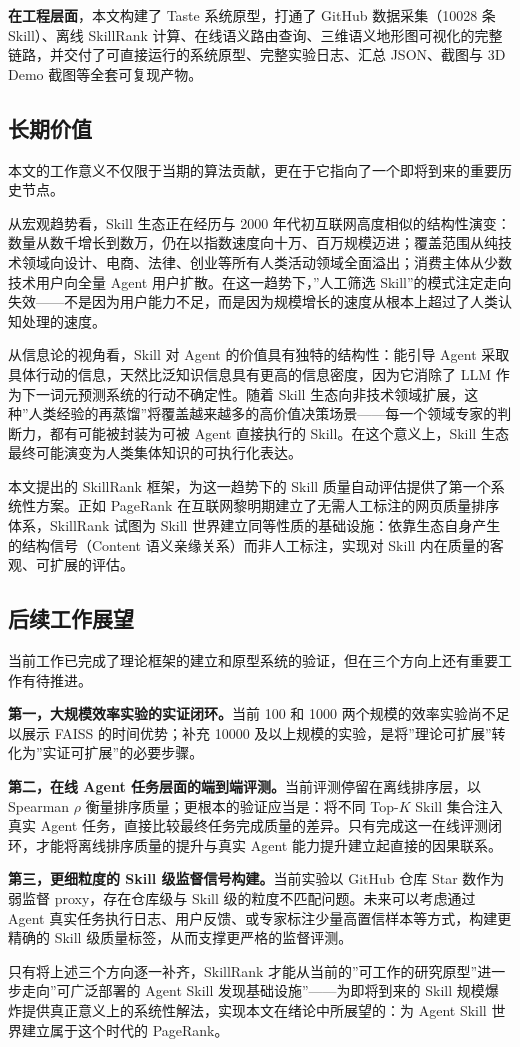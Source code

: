 \textbf{在工程层面}，本文构建了 Taste 系统原型，打通了 GitHub 数据采集（10028 条 Skill）、离线 SkillRank 计算、在线语义路由查询、三维语义地形图可视化的完整链路，并交付了可直接运行的系统原型、完整实验日志、汇总 JSON、截图与 3D Demo 截图等全套可复现产物。

\subsection{长期价值}

本文的工作意义不仅限于当期的算法贡献，更在于它指向了一个即将到来的重要历史节点。

从宏观趋势看，Skill 生态正在经历与 2000 年代初互联网高度相似的结构性演变：数量从数千增长到数万，仍在以指数速度向十万、百万规模迈进；覆盖范围从纯技术领域向设计、电商、法律、创业等所有人类活动领域全面溢出；消费主体从少数技术用户向全量 Agent 用户扩散。在这一趋势下，”人工筛选 Skill”的模式注定走向失效——不是因为用户能力不足，而是因为规模增长的速度从根本上超过了人类认知处理的速度。

从信息论的视角看，Skill 对 Agent 的价值具有独特的结构性：能引导 Agent 采取具体行动的信息，天然比泛知识信息具有更高的信息密度，因为它消除了 LLM 作为下一词元预测系统的行动不确定性。随着 Skill 生态向非技术领域扩展，这种”人类经验的再蒸馏”将覆盖越来越多的高价值决策场景——每一个领域专家的判断力，都有可能被封装为可被 Agent 直接执行的 Skill。在这个意义上，Skill 生态最终可能演变为人类集体知识的可执行化表达。

本文提出的 SkillRank 框架，为这一趋势下的 Skill 质量自动评估提供了第一个系统性方案。正如 PageRank 在互联网黎明期建立了无需人工标注的网页质量排序体系，SkillRank 试图为 Skill 世界建立同等性质的基础设施：依靠生态自身产生的结构信号（Content 语义亲缘关系）而非人工标注，实现对 Skill 内在质量的客观、可扩展的评估。

\subsection{后续工作展望}

当前工作已完成了理论框架的建立和原型系统的验证，但在三个方向上还有重要工作有待推进。

\textbf{第一，大规模效率实验的实证闭环。}当前 100 和 1000 两个规模的效率实验尚不足以展示 FAISS 的时间优势；补充 10000 及以上规模的实验，是将”理论可扩展”转化为”实证可扩展”的必要步骤。

\textbf{第二，在线 Agent 任务层面的端到端评测。}当前评测停留在离线排序层，以 Spearman $\rho$ 衡量排序质量；更根本的验证应当是：将不同 Top-$K$ Skill 集合注入真实 Agent 任务，直接比较最终任务完成质量的差异。只有完成这一在线评测闭环，才能将离线排序质量的提升与真实 Agent 能力提升建立起直接的因果联系。

\textbf{第三，更细粒度的 Skill 级监督信号构建。}当前实验以 GitHub 仓库 Star 数作为弱监督 proxy，存在仓库级与 Skill 级的粒度不匹配问题。未来可以考虑通过 Agent 真实任务执行日志、用户反馈、或专家标注少量高置信样本等方式，构建更精确的 Skill 级质量标签，从而支撑更严格的监督评测。

只有将上述三个方向逐一补齐，SkillRank 才能从当前的”可工作的研究原型”进一步走向”可广泛部署的 Agent Skill 发现基础设施”——为即将到来的 Skill 规模爆炸提供真正意义上的系统性解法，实现本文在绪论中所展望的：为 Agent Skill 世界建立属于这个时代的 PageRank。
